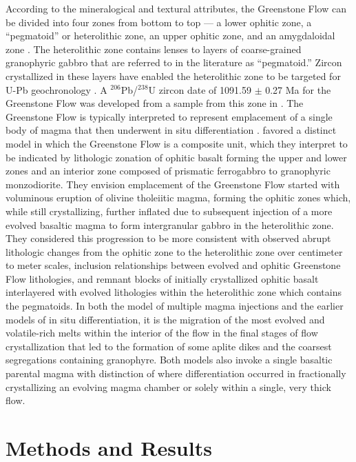 According to the mineralogical and textural attributes, the Greenstone Flow can be divided into four zones from bottom to top --- a lower ophitic zone, a ``pegmatoid'' or heterolithic zone, an upper ophitic zone, and an amygdaloidal zone \citep{Cornwall1951b}. The heterolithic zone contains lenses to layers of coarse-grained granophyric gabbro that are referred to in the literature as ``pegmatoid.'' Zircon crystallized in these layers have enabled the heterolithic zone to be targeted for U-Pb geochronology \citep{Davis1990a, Swanson-Hysell2019a}. A $^{206}$Pb/$^{238}$U zircon date of 1091.59 $\pm$ 0.27 Ma for the Greenstone Flow was developed from a sample from this zone in \cite{Swanson-Hysell2019a}. The Greenstone Flow is typically interpreted to represent emplacement of a single body of magma that then underwent in situ differentiation \citep{Huber1973a, Davis1990a}. \cite{Doyle2016a} favored a distinct model in which the Greenstone Flow is a composite unit, which they interpret to be indicated by lithologic zonation of ophitic basalt forming the upper and lower zones and an interior zone composed of prismatic ferrogabbro to granophyric monzodiorite. They envision emplacement of the Greenstone Flow started with voluminous eruption of olivine tholeiitic magma, forming the ophitic zones which, while still crystallizing, further inflated due to subsequent injection of a more evolved basaltic magma to form intergranular gabbro in the heterolithic zone. They considered this progression to be more consistent with observed abrupt lithologic changes from the ophitic zone to the heterolithic zone over centimeter to meter scales, inclusion relationships between evolved and ophitic Greenstone Flow lithologies, and remnant blocks of initially crystallized ophitic basalt interlayered with evolved lithologies within the heterolithic zone which contains the pegmatoids. In both the \cite{Doyle2016a} model of multiple magma injections and the earlier models of in situ differentiation, it is the migration of the most evolved and volatile-rich melts within the interior of the flow in the final stages of flow crystallization that led to the formation of some aplite dikes and the coarsest segregations containing granophyre. Both models also invoke a single basaltic parental magma with distinction of where differentiation occurred in fractionally crystallizing an evolving magma chamber or solely within a single, very thick flow.

\section{Methods and Results}

